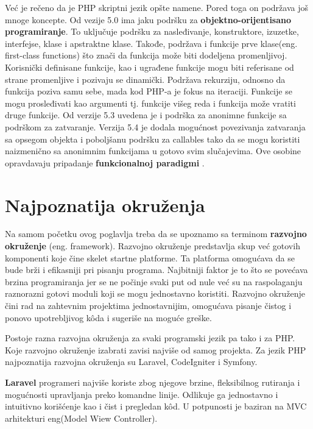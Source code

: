 \documentclass[a4paper]{article}
\begin{document}
{Već je rečeno da je PHP skriptni jezik opšte namene. Pored toga on podržava još mnoge koncepte. Od vezije 5.0 ima jaku podršku za \textbf{objektno-orijentisano programiranje}. To uključuje podršku za nasleđivanje, konstruktore, izuzetke, interfejse, klase i apstraktne klase. Takođe, podržava i funkcije prve klase(eng. first-class functions) što znači da funkcija može biti dodeljena promenljivoj. Korisnički definisane funkcije, kao i ugrađene funkcije mogu biti referisane od strane promenljive i pozivaju se dinamički. Podržava rekurziju, odnosno da funkcija poziva samu sebe, mada kod PHP-a je fokus na iteraciji. Funkcije se mogu prosleđivati kao argumenti tj. funkcije višeg reda i funkcija može vratiti druge funkcije. Od verzije 5.3 uvedena je i podrška za anonimne funkcije sa podrškom za zatvaranje. Verzija 5.4 je dodala mogućnost povezivanja zatvaranja sa opsegom objekta i poboljšanu podršku za callables tako da se mogu koristiti naizmenično sa anonimnim funkcijama u gotovo svim slučajevima. Ove osobine opravdavaju pripadanje \textbf{funkcionalnoj paradigmi} \cite{phpSrbija}. 

\section{Najpoznatija okruženja}
Na samom početku ovog poglavlja treba da se upoznamo sa terminom \textbf{razvojno okruženje} (eng. framework). Razvojno okruženje predstavlja skup već gotovih komponenti koje čine skelet startne platforme. Ta platforma omogućava da se bude brži i efikasniji pri pisanju programa. Najbitniji faktor je to što se povećava brzina programiranja jer se ne počinje svaki put od nule već su na raspolaganju raznorazni gotovi moduli koji se mogu jednostavno koristiti. Razvojno okruženje čini rad na zahtevnim projektima jednostavnijim, omogućava pisanje čistog i ponovo upotrebljivog k\^{o}da i  sugeriše na moguće greške.

Postoje razna razvojna okruženja za svaki programski jezik pa tako i za PHP. Koje razvojno okruženje izabrati zavisi najviše od samog projekta. Za jezik PHP najpoznatija razvojna okruženja su Laravel\cite{laravel}, CodeIgniter\cite{codeigniter} i Symfony\cite{symfony}.

\textbf{Laravel} programeri najviše koriste zbog njegove brzine, fleksibilnog rutiranja i mogućnosti upravljanja preko komandne linije. Odlikuje ga jednostavno i intuitivno korišćenje kao i čist i pregledan k\^{o}d. U potpunosti je baziran na MVC arhitekturi eng(Model Wiew Controller).

}
\end{document}
